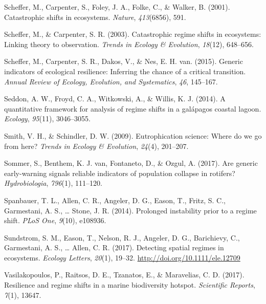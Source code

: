 \documentclass[12pt,twoside,openany]{reedthesis}
\begin{document}
\leavevmode\hypertarget{ref-scheffer_catastrophic_2001}{}%
Scheffer, M., Carpenter, S., Foley, J. A., Folke, C., \& Walker, B. (2001). Catastrophic shifts in ecosystems. \emph{Nature}, \emph{413}(6856), 591.

\leavevmode\hypertarget{ref-scheffer2003catastrophic}{}%
Scheffer, M., \& Carpenter, S. R. (2003). Catastrophic regime shifts in ecosystems: Linking theory to observation. \emph{Trends in Ecology \& Evolution}, \emph{18}(12), 648--656.

\leavevmode\hypertarget{ref-scheffer2015generic}{}%
Scheffer, M., Carpenter, S. R., Dakos, V., \& Nes, E. H. van. (2015). Generic indicators of ecological resilience: Inferring the chance of a critical transition. \emph{Annual Review of Ecology, Evolution, and Systematics}, \emph{46}, 145--167.

\leavevmode\hypertarget{ref-seddon2014quantitative}{}%
Seddon, A. W., Froyd, C. A., Witkowski, A., \& Willis, K. J. (2014). A quantitative framework for analysis of regime shifts in a galápagos coastal lagoon. \emph{Ecology}, \emph{95}(11), 3046--3055.

\leavevmode\hypertarget{ref-smith2009eutrophication}{}%
Smith, V. H., \& Schindler, D. W. (2009). Eutrophication science: Where do we go from here? \emph{Trends in Ecology \& Evolution}, \emph{24}(4), 201--207.

\leavevmode\hypertarget{ref-sommer2017generic}{}%
Sommer, S., Benthem, K. J. van, Fontaneto, D., \& Ozgul, A. (2017). Are generic early-warning signals reliable indicators of population collapse in rotifers? \emph{Hydrobiologia}, \emph{796}(1), 111--120.

\leavevmode\hypertarget{ref-spanbauer_prolonged_2014}{}%
Spanbauer, T. L., Allen, C. R., Angeler, D. G., Eason, T., Fritz, S. C., Garmestani, A. S., \ldots{} Stone, J. R. (2014). Prolonged instability prior to a regime shift. \emph{PLoS One}, \emph{9}(10), e108936.

\leavevmode\hypertarget{ref-sundstrom2017detecting}{}%
Sundstrom, S. M., Eason, T., Nelson, R. J., Angeler, D. G., Barichievy, C., Garmestani, A. S., \ldots{} Allen, C. R. (2017). Detecting spatial regimes in ecosystems. \emph{Ecology Letters}, \emph{20}(1), 19--32. \url{http://doi.org/10.1111/ele.12709}

\leavevmode\hypertarget{ref-vasilakopoulos2017resilience}{}%
Vasilakopoulos, P., Raitsos, D. E., Tzanatos, E., \& Maravelias, C. D. (2017). Resilience and regime shifts in a marine biodiversity hotspot. \emph{Scientific Reports}, \emph{7}(1), 13647.
\end{document}

